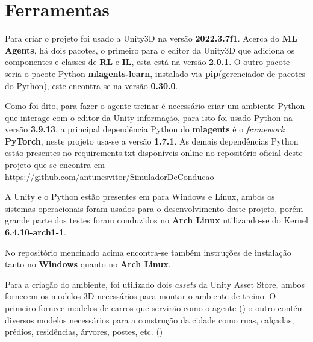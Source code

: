 \chapter{Ferramentas}\label{cap:ferramentas}

Para criar o projeto foi usado a Unity3D na versão \textbf{2022.3.7f1}. Acerca do \textbf{ML Agents}, há dois pacotes, o primeiro para o editor da Unity3D que adiciona os componentes e classes de \textbf{RL} e \textbf{IL}, esta está na versão \textbf{2.0.1}. O outro pacote seria o pacote Python \textbf{mlagents-learn}, instalado via \textbf{pip}(gerenciador de pacotes do Python), este encontra-se na versão \textbf{0.30.0}. 

Como foi dito, para fazer o agente treinar é necessário criar um ambiente Python que interage com o editor da Unity informação, para isto foi usado Python na versão \textbf{3.9.13}, a principal dependência Python do \textbf{mlagents} é o \textit{framework} \textbf{PyTorch}, neste projeto usa-se a versão \textbf{1.7.1}. As demais dependências Python estão presentes no requirements.txt disponíveis online no repositório oficial deste projeto que se encontra em \href{https://github.com/antunesvitor/SimuladorDeConducao}{https://github.com/antunesvitor/SimuladorDeConducao}

A Unity e o Python estão presentes em para Windows e Linux, ambos os sistemas operacionais foram usados para o desenvolvimento deste projeto, porém grande parte dos testes foram conduzidos no \textbf{Arch Linux} utilizando-se do Kernel \textbf{6.4.10-arch1-1}.


No repositório mencinado acima encontra-se também instruções de instalação tanto no \textbf{Windows} quanto no \textbf{Arch Linux}.

Para a criação do ambiente, foi utilizado dois \textit{assets} da Unity Asset Store, ambos fornecem os modelos 3D necessários para montar o ambiente de treino. O primeiro fornece modelos de carros que servirão como o agente () o outro contém diversos modelos necessários para a construção da cidade como ruas, calçadas, prédios, residências, árvores, postes, etc. ()

